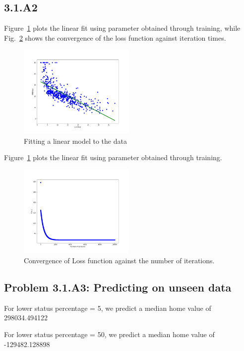 \documentclass[english,11pt]{article}
\begin{document}
\subsection*{3.1.A2}
Figure~\ref{fig:linear_fit} plots the linear fit using parameter obtained through training, while Fig.~\ref{fig:linear_convergence} shows the convergence of the loss function against iteration times.
\begin{figure}[H]
\centering
\includegraphics[width=0.5\textwidth]{../hw1/part1/3_1_A_Linear.png}
\caption{Fitting a linear model to the data}
\label{fig:linear_fit}
\end{figure}


Figure~\ref{fig:linear_fit} plots the linear fit using parameter obtained through training.
\begin{figure}[H]
\centering
\includegraphics[width=0.5\textwidth]{../hw1/part1/3_1_A_Convergence.png}
\caption{Convergence of Loss function against the number of iterations.}
\label{fig:linear_convergence}
\end{figure}

\subsection*{Problem 3.1.A3: Predicting on unseen data}
For lower status percentage = 5, we predict a median home value of 298034.494122

For lower status percentage = 50, we predict a median home value of -129482.128898
\end{document}
